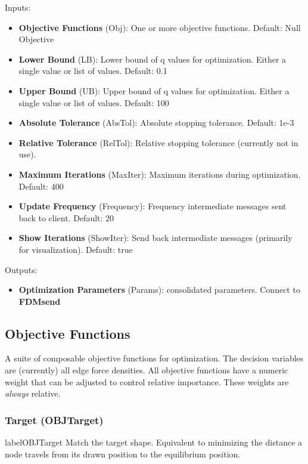 Inputs:
\begin{itemize}
    \setlength\itemsep{0.05em}
    \item \textbf{Objective Functions} (Obj): One or more objective functions. {\color{gray} Default: Null Objective}
    \item \textbf{Lower Bound} (LB): Lower bound of q values for optimization. Either a single value or list of values. {\color{gray} Default: 0.1}
    \item  \textbf{Upper Bound} (UB): Upper bound of q values for optimization. Either a single value or list of values. {\color{gray} Default: 100}
    \item \textbf{Absolute Tolerance} (AbsTol): Absolute stopping tolerance. {\color{gray} Default: 1e-3}
    \item \textbf{Relative Tolerance} (RelTol): Relative stopping tolerance (currently not in use).
    \item \textbf{Maximum Iterations} (MaxIter): Maximum iterations during optimization. {\color{gray} Default: 400}
    \item \textbf{Update Frequency} (Frequency): Frequency intermediate messages sent back to client. {\color{gray} Default: 20}
    \item \textbf{Show Iterations} (ShowIter): Send back intermediate messages (primarily for visualization). {\color{gray} Default: true}
\end{itemize}

Outputs:
\begin{itemize}
    \setlength\itemsep{0.05em}
    \item \textbf{Optimization Parameters} (Params): consolidated parameters. Connect to \textbf{FDMsend} 
\end{itemize}

\subsection{Objective Functions} \label{Objectives}
A suite of composable objective functions for optimization. The decision variables are (currently) all edge force densities. All objective functions have a numeric weight that can be adjusted to control relative importance. These weights are \textit{always} relative.

\subsubsection{Target (OBJTarget)} label{OBJTarget}
Match the target shape. Equivalent to minimizing the distance a node travels from its drawn position to the equilibrium position.

